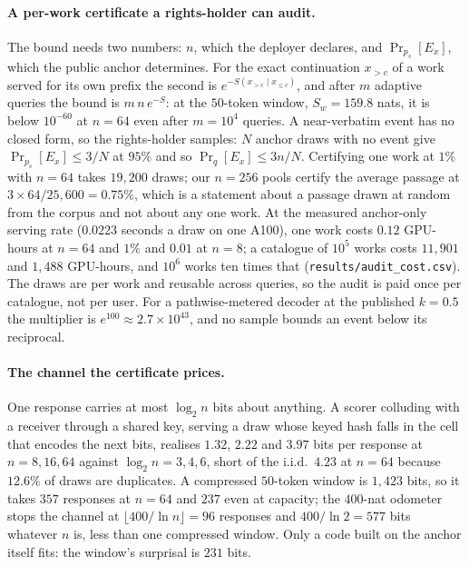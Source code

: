 \paragraph{A per-work certificate a rights-holder can audit.}\label{app:perwork}
The bound needs two numbers: $n$, which the deployer declares, and $\Pr_{p_s}[E_x]$, which the public
anchor determines. For the exact continuation $x_{>c}$ of a work served for its own prefix the second is
$e^{-S(x_{>c} \mid x_{\le c})}$, and after $m$ adaptive queries the bound is $m\,n\,e^{-S}$: at the
$50$-token window, $S_w = 159.8$ nats, it is below $10^{-60}$ at $n=64$ even after $m=10^4$ queries. A
near-verbatim event has no closed form, so the rights-holder samples: $N$ anchor draws with no event give
$\Pr_{p_s}[E_x] \le 3/N$ at $95\%$ and so $\Pr_q[E_x] \le 3n/N$. Certifying one work at $1\%$ with $n=64$
takes $19{,}200$ draws; our $n=256$ pools certify the average passage at $3 \times 64/25{,}600 = 0.75\%$,
which is a statement about a passage drawn at random from the corpus and not about any one work. At the
measured anchor-only serving rate ($0.0223$ seconds a draw on one A100), one work costs $0.12$ GPU-hours at
$n=64$ and $1\%$ and $0.01$ at $n=8$; a catalogue of $10^5$ works costs $11{,}901$ and $1{,}488$ GPU-hours, and
$10^6$ works ten times that (\texttt{results/\allowbreak audit\_\allowbreak cost.csv}). The draws are
per work and reusable across queries, so the audit is paid once per catalogue, not per user.
For a pathwise-metered decoder at the published $k = 0.5$ the multiplier is
$e^{100} \approx 2.7 \times 10^{43}$, and no sample bounds an event below its reciprocal.

\paragraph{The channel the certificate prices.}\label{app:channel}
One response carries at most $\log_2 n$ bits about anything. A scorer colluding with a receiver through a
shared key, serving a draw whose keyed hash falls in the cell that encodes the next bits, realises $1.32$,
$2.22$ and $3.97$ bits per response at $n = 8, 16, 64$ against $\log_2 n = 3, 4, 6$, short of the i.i.d.\
$4.23$ at $n=64$ because $12.6\%$ of draws are duplicates. A compressed $50$-token window is $1{,}423$ bits,
so it takes $357$ responses at $n=64$ and $237$ even at capacity; the $400$-nat odometer stops the channel at
$\lfloor 400/\ln n \rfloor = 96$ responses and $400/\ln 2 = 577$ bits whatever $n$ is, less than one
compressed window. Only a code built on the anchor itself fits: the window's surprisal is $231$ bits.

